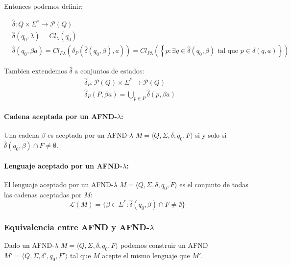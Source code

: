 Entonces podemos definir:

\begin{align*}
   & \hat\delta: Q \times \Sigma^* \to \mathcal{P}(Q)                                                                                                                                                             \\
   & \hat\delta(q_0,\lambda) = Cl_\lambda(q_0)                                                                                                                                                                    \\
   & \hat\delta(q_0, \beta a) = Cl_{P\lambda}\left(\delta_P(\hat\delta(q_0,\beta), a)\right) = Cl_{P\lambda}\left(\left\{ p: \exists q\in \hat\delta(q_0,\beta) \text{ tal que } p\in \delta(q,a) \right\}\right)
\end{align*}

Tambien extendemos \(\hat\delta\) a conjuntos de estados:
\begin{align*}
   & \hat\delta_P: \mathcal{P}(Q) \times \Sigma^* \to \mathcal{P}(Q)  \\
   & \hat\delta_P(P,\beta a) = \bigcup_{p\in P} \hat\delta(p,\beta a)
\end{align*}

\paragraph{Cadena aceptada por un AFND-\(\lambda\):} Una cadena \(\beta\) es aceptada por un AFND-\(\lambda\) \(M =\langle Q,\Sigma,\delta,q_0,F\rangle\) si y solo si \(\hat\delta(q_0,\beta)\cap F \neq \emptyset\).

\paragraph{Lenguaje aceptado por un AFND-\(\lambda\):} El lenguaje aceptado por un AFND-\(\lambda\) \(M =\langle Q,\Sigma,\delta,q_0,F\rangle\) es el conjunto de todas las cadenas aceptadas por \(M\):
\[\mathcal{L}(M) = \{\beta \in \Sigma^* : \hat\delta(q_0,\beta)\cap F \neq \emptyset\}\]

\subsubsection{Equivalencia entre AFND y AFND-\(\lambda\)}
\label{sec:afd-afd-lambda}
Dado un AFND-\(\lambda\) \(M =\langle Q,\Sigma,\delta,q_0,F\rangle\) podemos construir un AFND \(M' =\langle Q,\Sigma,\delta',q_0,F'\rangle\) tal que \(M\) acepte el mismo lenguaje que \(M'\).

